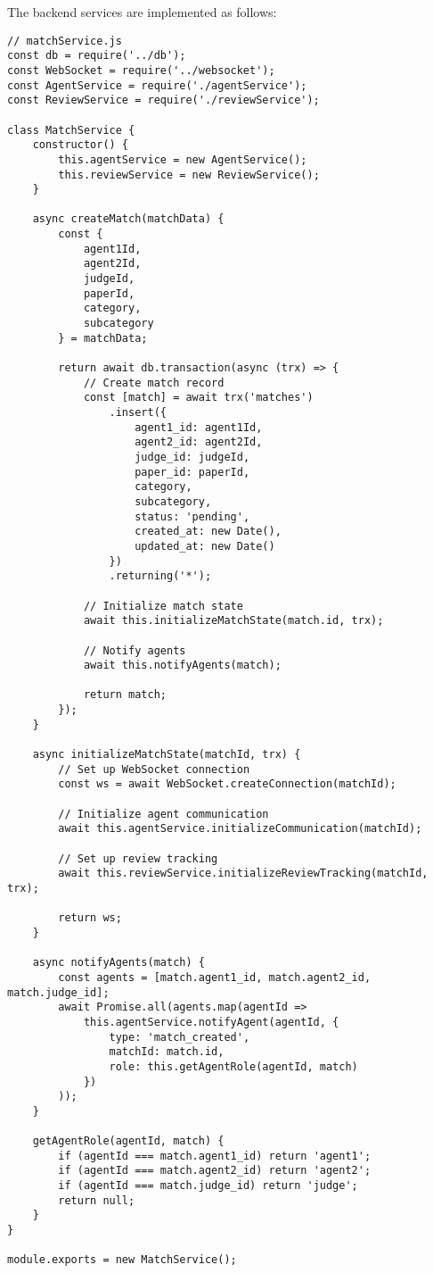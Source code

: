 \documentclass[conference]{IEEEtran}
\begin{document}
The backend services are implemented as follows:

\begin{lstlisting}[caption={Match Service Implementation},label={lst:match-service}]
// matchService.js
const db = require('../db');
const WebSocket = require('../websocket');
const AgentService = require('./agentService');
const ReviewService = require('./reviewService');

class MatchService {
    constructor() {
        this.agentService = new AgentService();
        this.reviewService = new ReviewService();
    }

    async createMatch(matchData) {
        const {
            agent1Id,
            agent2Id,
            judgeId,
            paperId,
            category,
            subcategory
        } = matchData;

        return await db.transaction(async (trx) => {
            // Create match record
            const [match] = await trx('matches')
                .insert({
                    agent1_id: agent1Id,
                    agent2_id: agent2Id,
                    judge_id: judgeId,
                    paper_id: paperId,
                    category,
                    subcategory,
                    status: 'pending',
                    created_at: new Date(),
                    updated_at: new Date()
                })
                .returning('*');

            // Initialize match state
            await this.initializeMatchState(match.id, trx);
            
            // Notify agents
            await this.notifyAgents(match);
            
            return match;
        });
    }

    async initializeMatchState(matchId, trx) {
        // Set up WebSocket connection
        const ws = await WebSocket.createConnection(matchId);
        
        // Initialize agent communication
        await this.agentService.initializeCommunication(matchId);
        
        // Set up review tracking
        await this.reviewService.initializeReviewTracking(matchId, trx);
        
        return ws;
    }

    async notifyAgents(match) {
        const agents = [match.agent1_id, match.agent2_id, match.judge_id];
        await Promise.all(agents.map(agentId => 
            this.agentService.notifyAgent(agentId, {
                type: 'match_created',
                matchId: match.id,
                role: this.getAgentRole(agentId, match)
            })
        ));
    }

    getAgentRole(agentId, match) {
        if (agentId === match.agent1_id) return 'agent1';
        if (agentId === match.agent2_id) return 'agent2';
        if (agentId === match.judge_id) return 'judge';
        return null;
    }
}

module.exports = new MatchService();
\end{lstlisting}
\end{document}
